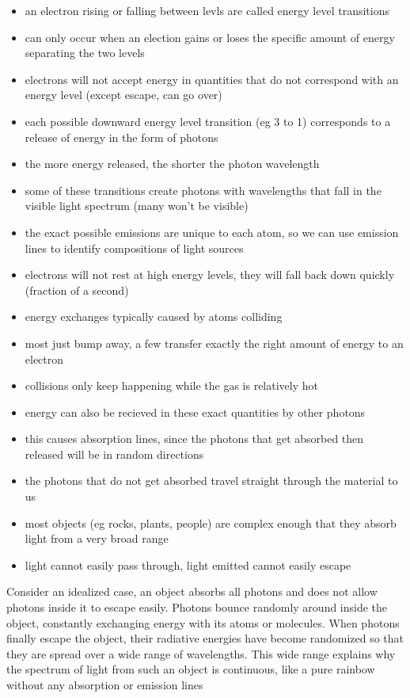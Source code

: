\documentclass[12pt]{article}
\begin{document}
\begin{itemize}
\item an electron rising or falling between levls are called energy level transitions
\item can only occur when an election gains or loses the specific amount of energy separating the two levels
\item electrons will not accept energy in quantities that do not correspond with an energy level (except escape, can go over)
\item each possible downward energy level transition (eg 3 to 1) corresponds to a release of energy in the form of photons
\item the more energy released, the shorter the photon wavelength
\item some of these transitions create photons with wavelengths that fall in the visible light spectrum (many won't be visible)
\item the exact possible emissions are unique to each atom, so we can use emission lines to identify compositions of light sources
\item electrons will not rest at high energy levels, they will fall back down quickly (fraction of a second)
\item energy exchanges typically caused by atoms colliding
\item most just bump away, a few transfer exactly the right amount of energy to an electron
\item collisions only keep happening while the gas is relatively hot
\item energy can also be recieved in these exact quantities by other photons
\item this causes absorption lines, since the photons that get absorbed then released will be in random directions
\item the photons that do not get absorbed travel straight through the material to us
\item most objects (eg rocks, plants, people) are complex enough that they absorb light from a very broad range
\item light cannot easily pass through, light emitted cannot easily escape
\end{itemize}

Consider an idealized case, an object absorbs all photons and does not allow photons inside it to escape easily. Photons bounce randomly around inside the object, constantly exchanging energy with its atoms or molecules. When photons finally escape the object, their radiative energies have become randomized so that they are spread over a wide range of wavelengths. This wide range explains why the spectrum of light from such an object is continuous, like a pure rainbow without any absorption or emission lines
\end{document}
